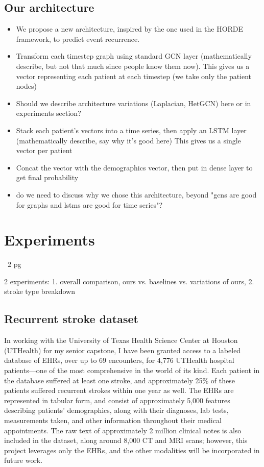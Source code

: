\documentclass[conference]{IEEEtran}
\begin{document}
\subsection{Our architecture}
\begin{itemize}
    \item We propose a new architecture, inspired by the one used in the HORDE framework, to predict event recurrence.
    \item Transform each timestep graph using standard GCN layer (mathematically describe, but not that much since people know them now).
            This gives us a vector representing each patient at each timestep (we take only the patient nodes)
    \item {\color{red} Should we describe architecture variations (Laplacian, HetGCN) here or in experiments section?}
    \item Stack each patient's vectors into a time series, then apply an LSTM layer (mathematically describe, say why it's good here)
            This gives us a single vector per patient
    \item Concat the vector with the demographics vector, then put in dense layer to get final probability
    \item {\color{red} do we need to discuss why we chose this architecture, beyond "gcns are good for graphs and lstms are good for time series"?}
\end{itemize}

\section{Experiments}
~2 pg

2 experiments: 1. overall comparison, ours vs. baselines vs. variations of ours, 2. stroke type breakdown

\subsection{Recurrent stroke dataset}

In working with the University of Texas Health Science Center at Houston (UTHealth) for my senior capstone, 
I have been granted access to a labeled database of EHRs, over up to 69 encounters, for 4,776 UTHealth hospital patients---one of the most comprehensive in the world of its kind. 
Each patient in the database suffered at least one stroke, and approximately 25\% of these patients suffered recurrent strokes within one year as well. 
The EHRs are represented in tabular form, and consist of approximately 5,000 features describing patients' demographics, along with their diagnoses, lab tests, measurements taken, and other information throughout their medical appointments. 
The raw text of approximately 2 million clinical notes is also included in the dataset, along around 8,000 CT and MRI scans; however, this project leverages only the EHRs, and the other modalities will be incorporated in future work.
\end{document}

